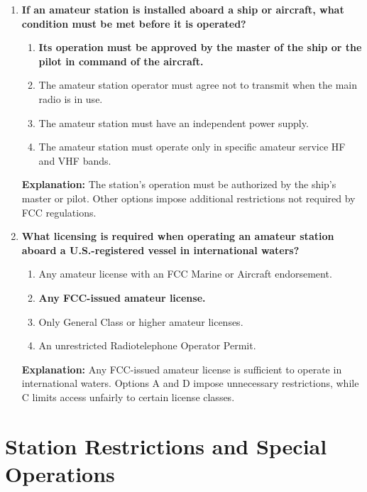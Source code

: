 \begin{enumerate}
    \item \textbf{If an amateur station is installed aboard a ship or aircraft, what condition must be met before it is operated?}
    \begin{enumerate}
        \item \textbf{Its operation must be approved by the master of the ship or the pilot in command of the aircraft.}\\
        \item The amateur station operator must agree not to transmit when the main radio is in use.\\
        \item The amateur station must have an independent power supply.\\
        \item The amateur station must operate only in specific amateur service HF and VHF bands.
    \end{enumerate}
    \textbf{Explanation:} The station’s operation must be authorized by the ship’s master or pilot. Other options impose additional restrictions not required by FCC regulations.

    \item \textbf{What licensing is required when operating an amateur station aboard a U.S.-registered vessel in international waters?}
    \begin{enumerate}
        \item Any amateur license with an FCC Marine or Aircraft endorsement.\\
        \item \textbf{Any FCC-issued amateur license.}\\
        \item Only General Class or higher amateur licenses.\\
        \item An unrestricted Radiotelephone Operator Permit.
    \end{enumerate}
    \textbf{Explanation:} Any FCC-issued amateur license is sufficient to operate in international waters. Options A and D impose unnecessary restrictions, while C limits access unfairly to certain license classes.
\end{enumerate}




\section{Station Restrictions and Special Operations}

